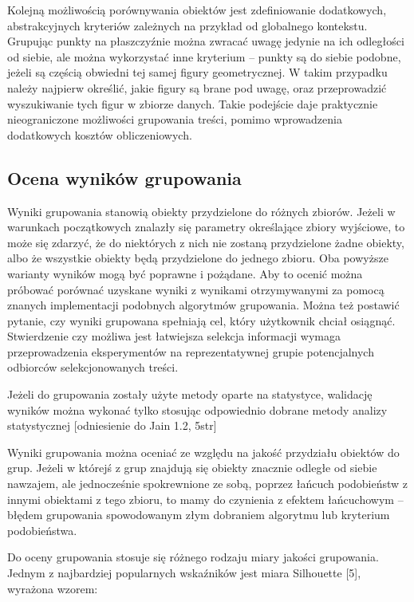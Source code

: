\documentclass{article}
\begin{document}
Kolejną możliwością porównywania obiektów jest zdefiniowanie dodatkowych, abstrakcyjnych kryteriów zależnych na przykład od globalnego kontekstu. Grupując punkty na płaszczyźnie można zwracać uwagę jedynie na ich odległości od siebie, ale można wykorzystać inne kryterium – punkty są do siebie podobne, jeżeli są częścią obwiedni tej samej figury geometrycznej. W takim przypadku należy najpierw określić, jakie figury są brane pod uwagę, oraz przeprowadzić wyszukiwanie tych figur w zbiorze danych. Takie podejście daje praktycznie nieograniczone możliwości grupowania treści, pomimo wprowadzenia dodatkowych kosztów obliczeniowych.

\subsection{Ocena wyników grupowania}

Wyniki grupowania stanowią obiekty przydzielone do różnych zbiorów. Jeżeli w warunkach początkowych znalazły się parametry określające zbiory wyjściowe, to może się zdarzyć, że do niektórych z nich nie zostaną przydzielone żadne obiekty, albo że wszystkie obiekty będą przydzielone do jednego zbioru. Oba powyższe warianty wyników mogą być poprawne i pożądane. Aby to ocenić można próbować porównać uzyskane wyniki z wynikami otrzymywanymi za pomocą znanych implementacji podobnych algorytmów grupowania. Można też postawić pytanie, czy wyniki grupowana spełniają cel, który użytkownik chciał osiągnąć. Stwierdzenie czy możliwa jest łatwiejsza selekcja informacji wymaga przeprowadzenia eksperymentów na reprezentatywnej grupie potencjalnych odbiorców selekcjonowanych treści.

Jeżeli do grupowania zostały użyte metody oparte na statystyce, walidację wyników można wykonać tylko stosując odpowiednio dobrane metody analizy statystycznej [odniesienie do Jain 1.2, 5str]

Wyniki grupowania można oceniać ze względu na jakość przydziału obiektów do grup. Jeżeli w którejś z grup znajdują się obiekty znacznie odległe od siebie nawzajem, ale jednocześnie spokrewnione ze sobą, poprzez łańcuch podobieństw z innymi obiektami z tego zbioru, to mamy do czynienia z efektem łańcuchowym – błędem grupowania spowodowanym złym dobraniem algorytmu lub kryterium podobieństwa.

Do oceny grupowania stosuje się różnego rodzaju miary jakości grupowania. Jednym z najbardziej popularnych wskaźników jest miara Silhouette [5], wyrażona wzorem:
\end{document}
